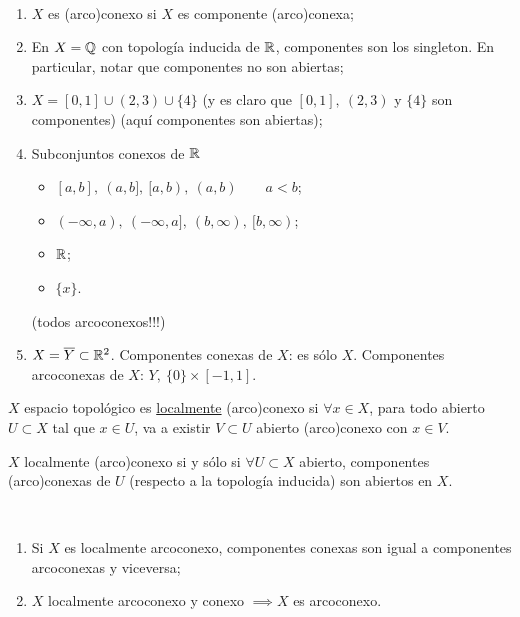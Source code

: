 \begin{eg}~
	\begin{enumerate}
		\item $X$ es (arco)conexo si $X$ es componente (arco)conexa;

		\item En $X = \mathbb{Q}$ con topología inducida de $\mathbb{R}$, componentes son los singleton. En particular, notar que componentes no son abiertas;

		\item $X = [0,1] \cup (2,3) \cup \{4\}$ (y es claro que $[0,1],\ (2,3)$ y $\{4\}$ son componentes) (aquí componentes son abiertas);

		\item Subconjuntos conexos de $\mathbb{R}$
		\begin{itemize}
			\item $[a,b],\ (a,b],\ [a,b),\ (a,b) \qquad a<b$;

			\item $(-\infty,a),\ (-\infty,a],\ (b,\infty),\ [b,\infty)$;

			\item $\mathbb{R}$;

			\item $\{x\}$.  
		\end{itemize}
		(todos arcoconexos!!!)

		\item $X = \overline{Y} \subset \mathbb{R}^2$. Componentes conexas de $X$: es sólo $X$. Componentes arcoconexas de $X$: $Y,\ \{0\} \times [-1,1]$.
	\end{enumerate}
\end{eg}

\begin{definition}
	$X$ espacio topológico es \uline{localmente} (arco)conexo si $\forall x \in X$, para todo abierto $U \subset X$ tal que $x \in U$, va a existir $V \subset U$ abierto (arco)conexo con $x \in V$.
\end{definition}

\begin{criterio}
$X$ localmente (arco)conexo si y sólo si $\forall U \subset X$ abierto, componentes (arco)conexas de $U$ (respecto a la topología inducida) son abiertos en $X$.
\end{criterio}	

\begin{corollary}~
	\begin{enumerate}
		\item Si $X$ es localmente arcoconexo, componentes conexas son igual a componentes arcoconexas y viceversa;

		\item $X$ localmente arcoconexo y conexo $\implies X$ es arcoconexo.
	\end{enumerate}
\end{corollary}
